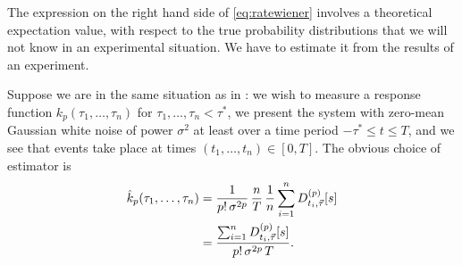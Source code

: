 \documentclass[12pt]{article}
\theoremstyle{slplain}
\theoremstyle{sldefinition}
\theoremstyle{remark}
\begin{document}
The expression on the right hand side of \eqref{eq:ratewiener} involves a theoretical expectation value, with respect to the true probability distributions that we will not know in an experimental situation. We have to estimate it from the results of an experiment.


Suppose we are in the same situation as in : we wish to measure a response function $k_p(\tau_1,\ldots,\tau_n)$ for $\tau_1,\ldots,\tau_n < \tau^*$, we present the system with zero-mean Gaussian white noise of power $\sigma^2$ at least over a time period $-\tau^* \leq t \leq T$, and we see that events take place at times $(t_1,\ldots,t_n) \in [0,T]$. The obvious choice of estimator is
%
\begin{equation}\label{eq:ratewienerest}
  \begin{aligned}
    \hat{k}_p(\tau_1,\ldots,\tau_n) &= \frac{1}{p!\,\sigma^{2p}} \, \frac{n}{T} \, \frac{1}{n} \sum_{i=1}^n D^{(p)}_{t_i,\vec{\tau}}[s] \\
      &= \frac{ \sum_{i=1}^n D^{(p)}_{t_i,\vec{\tau}}[s]}{p!\,\sigma^{2p}\,T}.
  \end{aligned}
\end{equation}
%
\end{document}
